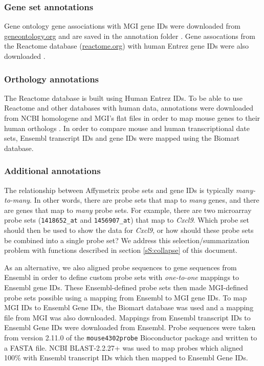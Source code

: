 \subsubsection{Gene set annotations}

Gene ontology gene associations with MGI gene IDs 
were downloaded from \href{http://geneontology.org}{geneontology.org} and
are saved in the annotation folder \cite{Ashburner:2000ja}. Gene 
assocations from the Reactome
database (\href{http://www.reactome.org}{reactome.org}) with human Entrez gene IDs were 
also downloaded \cite{Matthews:2009kj}.

\subsubsection{Orthology annotations}

The Reactome database is built using Human Entrez IDs. To be able to use
Reactome and other databases with human data, annotations were downloaded
from NCBI homologene and MGI's flat files in order
to map mouse genes to their human 
orthologs \cite{Eppig:2012ix}. In order to compare mouse and human
transcriptional date sets, Ensembl transcript IDs and gene IDs were mapped
using the Biomart database.

\subsubsection{Additional annotations}
\label{sS:newProbeSets}

The relationship between Affymetrix probe sets and gene IDs is typically
\emph{many-to-many}. In other words, there are probe sets that map
to \emph{many} genes, and there are genes that map to \emph{many}
probe sets. For example, there are two microarray probe sets
(\texttt{1418652\_at} and \texttt{1456907\_at}) that map to \emph{Cxcl9}.
Which probe set should then be used to show the data for \emph{Cxcl9}, or how should
these probe sets be combined into a single probe set? We address this 
selection/summarization problem with functions described in 
section \ref{sS:collapse} of this document. 

As an alternative, we also
aligned probe sequences to gene sequences from Ensembl \cite{Flicek:2012ks} in order to 
define custom probe sets with \emph{one-to-one} mappings to Ensembl gene IDs. 
These Ensembl-defined probe sets then made MGI-defined 
probe sets possible using a mapping from Ensembl to MGI gene IDs. To map MGI 
IDs to Ensembl Gene IDs, the Biomart database was used and
a mapping file from MGI was also downloaded. Mappings from Ensembl
transcript IDs to Ensembl Gene IDs were downloaded from Ensembl. Probe
sequences were taken from version 2\@.11\@.0 of the \texttt{mouse4302probe}
Bioconductor package and written to a FASTA file. NCBI BLAST-2\@.2\@.27+
was used to map probes which aligned 100\% with Ensembl transcript IDs which
then mapped to Ensembl Gene IDs. 

